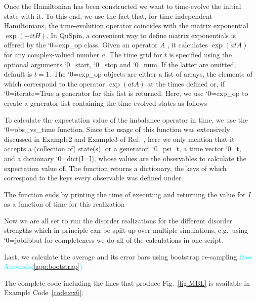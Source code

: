 \documentclass{SciPost}
\newcommand\0{\scalebox{-1}[1]{0}}
\let\svttfamily\ttfamily
\renewcommand\ttfamily{\svttfamily\catcode`0=\active }
\renewcommand\texttt{\bgroup\ttfamily\texttthelp}
\def\texttthelp#1{#1\egroup}
\newcommand*{\cyan}{\textcolor{cyan}}
\newcommand{\MBLcode}{example9.py}
\begin{document}
Once the Hamiltonian has been constructed we want to time-evolve the initial state with it. To this end, we use the fact that, for time-independent Hamiltonians, the time-evolution operator coincides with the matrix exponential $\exp(-itH)$. In QuSpin, a convenient way to define matrix exponentials is offered by the \texttt{exp\_op} class. Given an operator $A$ , it calculates $\exp(atA)$ for any complex-valued number $a$. The time grid for $t$ is specified using the optional arguments \texttt{start}, \texttt{stop} and \texttt{num}. If the latter are omitted, default is $t=1$. The \texttt{exp\_op} objects are either a list of arrays, the elements of which correspond to the operator $\exp(atA)$ at the times defined or, if \texttt{iterate=True} a generator for this list is returned. Here, we use \texttt{exp\_op} to create a generator list containing the time-evolved states as follows


To calculate the expectation value of the imbalance operator in time, we use the \texttt{obs\_vs\_time} function. Since the usage of this function was extensively discussed in Example2 and Example3 of Ref.~\cite{weinberg_17_quspin}, here we only mention that it accepts a (collection of) state(s) [or a generator] \texttt{psi\_t}, a time vector \texttt{t}, and a dictionary \texttt{dict(I=I)}, whose values are the observables to calculate the expectation value of. The function returns a dictionary, the keys of which correspond to the keys every observable was defined under.


The function ends by printing the time of executing and returning the value for $I$ as a function of time for this realization


Now we are all set to run the disorder realizations for the different disorder strengths which in principle can be spilt up over multiple simulations, e.g.~using \texttt{joblib} [c.f.~Example2 from Ref.~\cite{weinberg_17_quspin}] but for completeness we do all of the calculations in one script. 

Last, we calculate the average and its error bars using bootstrap re-sampling \cyan{(See Appendix\ref{app:bootstrap})}


The complete code including the lines that produce Fig.~\ref{fig:MBL} is available in Example Code~\ref{code:ex6}.
\end{document}
